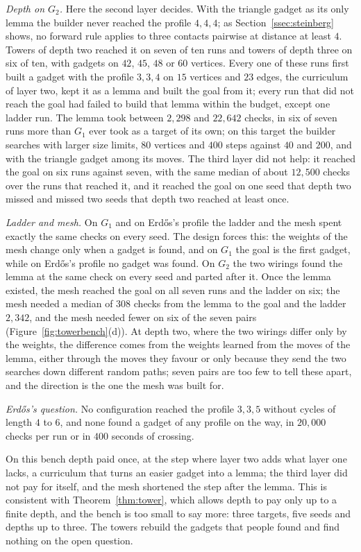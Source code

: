 \emph{Depth on $G_{2}$.} Here the second layer decides. With the triangle gadget as its only lemma the builder never reached the profile $4,4,4$; as Section~\ref{ssec:steinberg} shows, no forward rule applies to three contacts pairwise at distance at least $4$. Towers of depth two reached it on seven of ten runs and towers of depth three on six of ten, with gadgets on $42$, $45$, $48$ or $60$ vertices. Every one of these runs first built a gadget with the profile $3,3,4$ on $15$ vertices and $23$ edges, the curriculum of layer two, kept it as a lemma and built the goal from it; every run that did not reach the goal had failed to build that lemma within the budget, except one ladder run. The lemma took between $2{,}298$ and $22{,}642$ checks, in six of seven runs more than $G_{1}$ ever took as a target of its own; on this target the builder searches with larger size limits, $80$ vertices and $400$ steps against $40$ and $200$, and with the triangle gadget among its moves. The third layer did not help: it reached the goal on six runs against seven, with the same median of about $12{,}500$ checks over the runs that reached it, and it reached the goal on one seed that depth two missed and missed two seeds that depth two reached at least once.

\emph{Ladder and mesh.} On $G_{1}$ and on Erd\H{o}s's profile the ladder and the mesh spent exactly the same checks on every seed. The design forces this: the weights of the mesh change only when a gadget is found, and on $G_{1}$ the goal is the first gadget, while on Erd\H{o}s's profile no gadget was found. On $G_{2}$ the two wirings found the lemma at the same check on every seed and parted after it. Once the lemma existed, the mesh reached the goal on all seven runs and the ladder on six; the mesh needed a median of $308$ checks from the lemma to the goal and the ladder $2{,}342$, and the mesh needed fewer on six of the seven pairs (Figure~\ref{fig:towerbench}(d)). At depth two, where the two wirings differ only by the weights, the difference comes from the weights learned from the moves of the lemma, either through the moves they favour or only because they send the two searches down different random paths; seven pairs are too few to tell these apart, and the direction is the one the mesh was built for.

\emph{Erd\H{o}s's question.} No configuration reached the profile $3,3,5$ without cycles of length $4$ to $6$, and none found a gadget of any profile on the way, in $20{,}000$ checks per run or in $400$ seconds of crossing.

On this bench depth paid once, at the step where layer two adds what layer one lacks, a curriculum that turns an easier gadget into a lemma; the third layer did not pay for itself, and the mesh shortened the step after the lemma. This is consistent with Theorem~\ref{thm:tower}, which allows depth to pay only up to a finite depth, and the bench is too small to say more: three targets, five seeds and depths up to three. The towers rebuild the gadgets that people found and find nothing on the open question.
